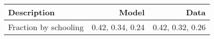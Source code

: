 \begin{tabular}{lrr}
\hline
Description & Model  & Data  \\ 
\hline
Fraction by schooling & 0.42, 0.34, 0.24  & 0.42, 0.32, 0.26  \\ 
\hline
\end{tabular}%
